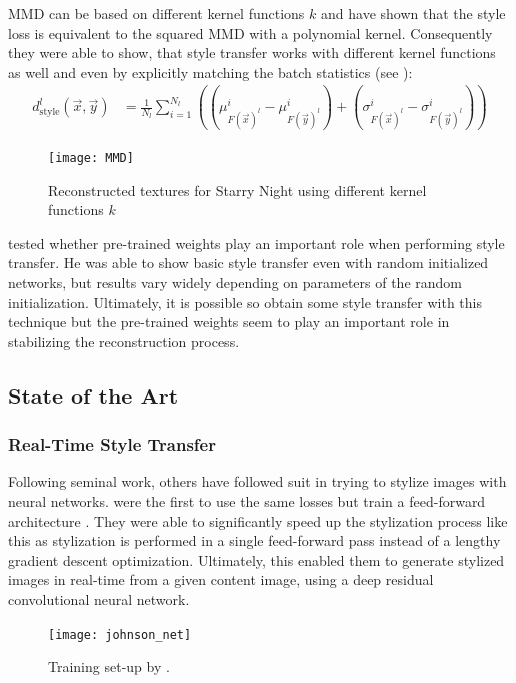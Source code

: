 MMD can be based on different kernel functions $k$ and \citeauthor*{MMD} have shown that the style loss is equivalent to the squared MMD with a polynomial kernel.
Consequently they were able to show, that style transfer works with different kernel functions as well and even by explicitly matching the batch statistics (see ):
\begin{align}
    d_{\text{style}}^l(\vec{x}, \vec{y}) & = \frac{1}{N_l} \sum_{i = 1}^{N_l} \left( (\mu^i_{F(\vec{x})^l} - \mu^i_{F(\vec{y})^l}) + (\sigma^i_{F(\vec{x})^l} - \sigma^i_{F(\vec{y})^l}) \right)
\end{align}
\begin{figure}
    \texttt{[image: MMD]}
    \caption[]{Reconstructed textures for Starry Night using different kernel functions $k$ \cite{MMD}}
\end{figure}

\citeauthor*{LenDu} tested whether pre-trained weights play an important role when performing style transfer.
He was able to show basic style transfer even with random initialized networks, but results vary widely depending on parameters of the random initialization.
Ultimately, it is possible so obtain some style transfer with this technique but the pre-trained weights seem to play an important role in stabilizing the reconstruction process.

\subsection{State of the Art}

\subsubsection{Real-Time Style Transfer}
Following \citeauthor*{gatys} seminal work, others have followed suit in trying to stylize images with neural networks.
\citeauthor*{Johnson} were the first to use the same losses but train a feed-forward architecture \cite{johnson}.
They were able to significantly speed up the stylization process like this as stylization is performed in a single feed-forward pass instead of a lengthy gradient descent optimization.
Ultimately, this enabled them to generate stylized images in real-time from a given content image, using a deep residual convolutional neural network.
\begin{figure}
    \texttt{[image: johnson\_net]}
    \caption[]{Training set-up by \citeauthor*{johnson}. \cite{johnson}}
\end{figure}

